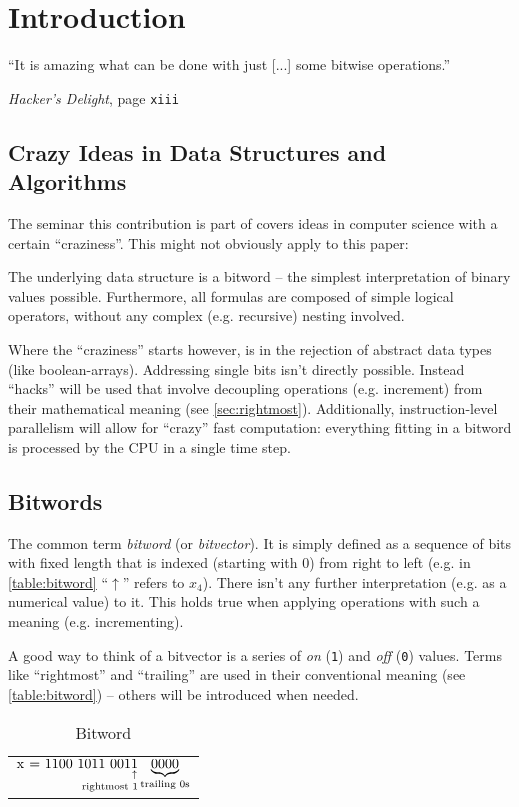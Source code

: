 \section{Introduction}\label{sec:introduction}
\epigraph{
``It is amazing what can be done
with just [...] some bitwise operations.''
}{
\emph{Hacker's Delight}, page \texttt{xiii}
\cite{Warren:2012:HD:2462741}
}


\subsection*{Crazy Ideas in Data Structures and Algorithms}
The seminar this contribution is part of covers
ideas in computer science with a certain ``craziness''.
This might not obviously apply to this paper:

The underlying data structure is a bitword
-- the simplest interpretation of binary values possible.
Furthermore, all formulas are composed of simple logical operators,
without any complex (e.g. recursive) nesting involved.

Where the ``craziness'' starts however,
is in the rejection of abstract data types (like boolean-arrays).
Addressing single bits isn't directly possible.
Instead ``hacks'' will be used that involve decoupling
operations (e.g. increment) from their mathematical meaning
(see \autoref{sec:rightmost}).
Additionally, instruction-level parallelism will allow for
``crazy'' fast computation: everything fitting in a bitword
is processed by the CPU in a single time step.


\subsection*{Bitwords}
The common term \emph{bitword} (or \emph{bitvector}).
It is simply defined as a sequence of bits with fixed length
that is indexed (starting with $0$) from right to left
(e.g. in \autoref{table:bitword} ``$\uparrow$'' refers to $x_4$).
There isn't any further interpretation (e.g. as a numerical value) to it.
This holds true when applying operations with such a meaning
(e.g. incrementing).

A good way to think of a bitvector is a series of
\emph{on} (\lstinline$1$) and \emph{off} (\lstinline$0$) values.
Terms like ``rightmost'' and ``trailing''
are used in their conventional meaning (see \autoref{table:bitword})
-- others will be introduced when needed.

\begin{table}[H]
\centering
\begin{tabular}{r}
$\underset{\text{\hfill rightmost \lstinline$1$}}
{\text{\lstinline$x = 1100 1011 001$}
{\underset{\uparrow}{\text{\lstinline$1$}}}}
\underbrace{\text{\lstinline$0000$}}_{\text{trailing \lstinline$0$s}}$\\
\end{tabular}
\caption{Bitword}
\label{table:bitword}
\end{table}


